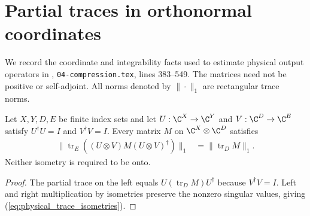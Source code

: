\section{Partial traces in orthonormal coordinates}
\label{ch:physical_trace_coordinates}

We record the coordinate and integrability facts used to estimate physical
output operators in \cite[proof of Theorem~5.2]{OpenAI2026PolynomialPEPS},
\texttt{04-compression.tex}, lines 383--549. The matrices need not be positive
or self-adjoint. All norms denoted by $\|\cdot\|_1$ are rectangular trace norms.

\begin{theorem}
    \label{thm:physical_trace_isometries}
    \leanok
    Let $X,Y,D,E$ be finite index sets and let
    $U:\C^X\to\C^Y$ and $V:\C^D\to\C^E$ satisfy
    $U^{\dagger}U=I$ and $V^{\dagger}V=I$.
    Every matrix $M$ on $\C^X\otimes\C^D$ satisfies
    \begin{align}
        \bigl\|\operatorname{tr}_{E}
        ((U\otimes V)M(U\otimes V)^{\dagger})\bigr\|_1
         & =\|\operatorname{tr}_{D}M\|_1.
        \label{eq:physical_trace_isometries}
    \end{align}
    Neither isometry is required to be onto.
\end{theorem}

\begin{proof}\leanok
    The partial trace on the left equals
    $U(\operatorname{tr}_{D}M)U^{\dagger}$ because
    $V^{\dagger}V=I$. Left and right multiplication by isometries preserve
    the nonzero singular values, giving (\ref{eq:physical_trace_isometries}).
\end{proof}

